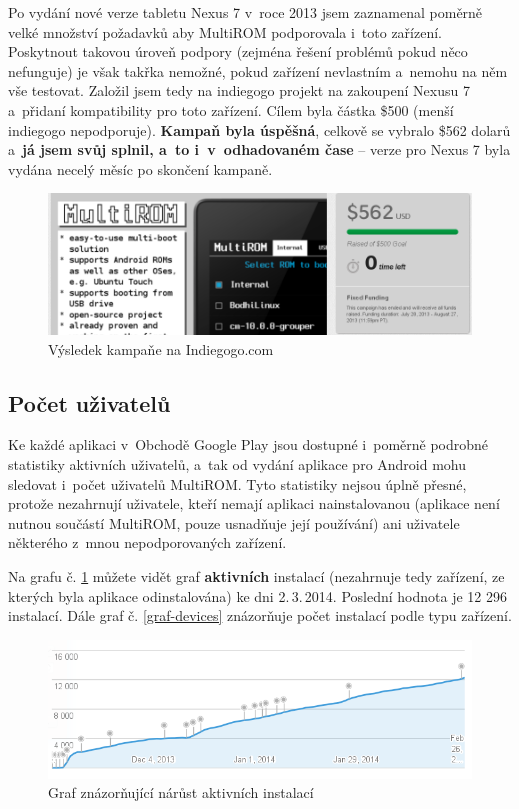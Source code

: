 \documentclass[12pt, a4paper, oneside]{article}
\newcommand{\B}{\textbf} %
\begin{document}
Po vydání nové verze tabletu Nexus 7 v~roce 2013 jsem zaznamenal poměrně velké množství požadavků aby MultiROM podporovala i~toto zařízení. Poskytnout takovou úroveň podpory (zejména řešení problémů pokud něco nefunguje) je však takřka nemožné, pokud zařízení nevlastním a~nemohu na něm vše testovat. Založil jsem tedy na indiegogo projekt na zakoupení Nexusu 7 a~přidaní kompatibility pro toto zařízení\cite{indiegogo-multirom}. Cílem byla částka \$500 (menší indiegogo nepodporuje). \B{Kampaň byla úspěšná}, celkově se vybralo \$562 dolarů a~\B{já jsem svůj  splnil, a~to i~v~odhadovaném čase} -- verze pro Nexus 7 byla vydána necelý měsíc po skončení kampaně.

\begin{figure}[H]
\begin{center}
 \includegraphics[width=\textwidth]{img/indiegogo.png}
\caption{Výsledek kampaňe na Indiegogo.com}
\end{center}
\end{figure}

\subsection{Počet uživatelů}
Ke každé aplikaci v~Obchodě Google Play jsou dostupné i~poměrně podrobné statistiky aktivních uživatelů, a~tak od vydání aplikace pro Android mohu sledovat i~počet uživatelů MultiROM. Tyto statistiky nejsou úplně přesné, protože nezahrnují uživatele, kteří nemají aplikaci nainstalovanou (aplikace není nutnou součástí MultiROM, pouze usnadňuje její používání) ani uživatele některého z~mnou nepodporovaných zařízení.

Na grafu č. \ref{graf-uzivatele} můžete vidět graf \B{aktivních} instalací (nezahrnuje tedy zařízení, ze kterých byla aplikace odinstalována) ke dni 2.\,3.\,2014. Poslední hodnota je 12 296 instalací. Dále graf č. \ref{graf-devices} znázorňuje počet instalací podle typu zařízení.

\begin{figure}[H]
\begin{center}
 \includegraphics[width=\textwidth]{img/graph_active.png}
\caption{Graf znázorňující nárůst aktivních instalací}
\label{graf-uzivatele}
\end{center}
\end{figure}
\end{document}
